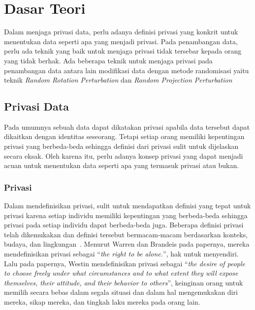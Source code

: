 \chapter{Dasar Teori}
\label{chap:teori}

Dalam menjaga privasi data, perlu adanya definisi privasi yang konkrit untuk menentukan data seperti apa yang menjadi privasi. Pada penambangan data, perlu ada teknik yang baik untuk menjaga privasi tidak tersebar kepada orang yang tidak berhak. Ada beberapa teknik untuk menjaga privasi pada penambangan data antara lain modifikasi data dengan metode randomisasi yaitu teknik \textit{Random Rotation Perturbation} dan \textit{Random Projection Perturbation}

\section{Privasi Data}
\label{sec:privasidata} 

Pada umumnya sebuah data dapat dikatakan privasi apabila data tersebut dapat dikaitkan dengan identitas seseorang. Tetapi setiap orang memiliki kepentingan privasi yang berbeda-beda sehingga definisi dari privasi sulit untuk dijelaskan secara eksak. Oleh karena itu, perlu adanya konsep privasi yang dapat menjadi acuan untuk menentukan data seperti apa yang termasuk privasi atau bukan.

\subsection{Privasi}
\label{subsec:privasi}

Dalam mendefinisikan privasi, sulit untuk mendapatkan definisi yang tepat untuk privasi karena setiap individu memiliki kepentingan yang berbeda-beda sehingga privasi pada setiap individu dapat berbeda-beda juga. Beberapa definisi privasi telah dikemukakan dan definisi tersebut bermacam-macam berdasarkan konteks, budaya, dan lingkungan~\cite{stanleyosmar:04:standardppdm}. Menurut Warren dan Brandeis pada papernya, mereka mendefinisikan privasi sebagai “\textit{the right to be alone.}”, hak untuk menyendiri. Lalu pada papernya, Westin mendefinisikan privasi sebagai “\textit{the desire of people to choose freely under what circumstances and to what extent they will expose themselves, their attitude, and their behavior to others}”, keinginan orang untuk memilih secara bebas dalam segala situasi dan dalam hal mengemukakan diri mereka, sikap mereka, dan tingkah laku mereka pada orang lain. 

